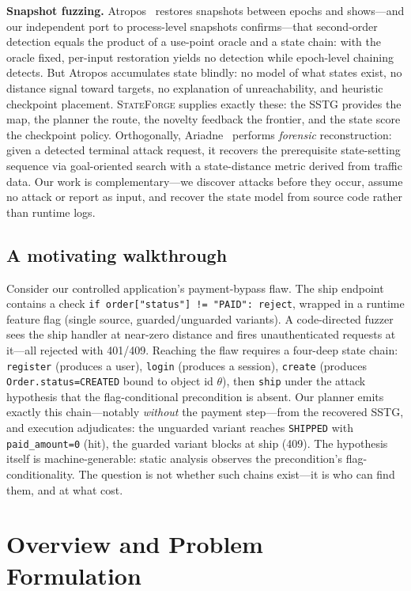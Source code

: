 \documentclass[letterpaper,twocolumn,10pt]{article}
\newcommand{\sys}{\textsc{StateForge}}
\begin{document}
\textbf{Snapshot fuzzing.} Atropos~\cite{atropos} restores snapshots between epochs and shows---and our independent port to process-level snapshots confirms---that second-order detection equals the product of a use-point oracle and a state chain: with the oracle fixed, per-input restoration yields no detection while epoch-level chaining detects. But Atropos accumulates state blindly: no model of what states exist, no distance signal toward targets, no explanation of unreachability, and heuristic checkpoint placement. \sys{} supplies exactly these: the SSTG provides the map, the planner the route, the novelty feedback the frontier, and the state score the checkpoint policy. Orthogonally, Ariadne~\cite{ariadne} performs \emph{forensic} reconstruction: given a detected terminal attack request, it recovers the prerequisite state-setting sequence via goal-oriented search with a state-distance metric derived from traffic data. Our work is complementary---we discover attacks before they occur, assume no attack or report as input, and recover the state model from source code rather than runtime logs.

\subsection{A motivating walkthrough}
Consider our controlled application's payment-bypass flaw. The ship endpoint contains a check \texttt{if order["status"] != "PAID": reject}, wrapped in a runtime feature flag (single source, guarded/unguarded variants). A code-directed fuzzer sees the ship handler at near-zero distance and fires unauthenticated requests at it---all rejected with 401/409. Reaching the flaw requires a four-deep state chain: \texttt{register} (produces a user), \texttt{login} (produces a session), \texttt{create} (produces \texttt{Order.status=CREATED} bound to object id $\theta$), then \texttt{ship} under the attack hypothesis that the flag-conditional precondition is absent. Our planner emits exactly this chain---notably \emph{without} the payment step---from the recovered SSTG, and execution adjudicates: the unguarded variant reaches \texttt{SHIPPED} with \texttt{paid\_amount=0} (hit), the guarded variant blocks at ship (409). The hypothesis itself is machine-generable: static analysis observes the precondition's flag-conditionality. The question is not whether such chains exist---it is who can find them, and at what cost.

\section{Overview and Problem Formulation}
\label{sec:formulation}
\end{document}
